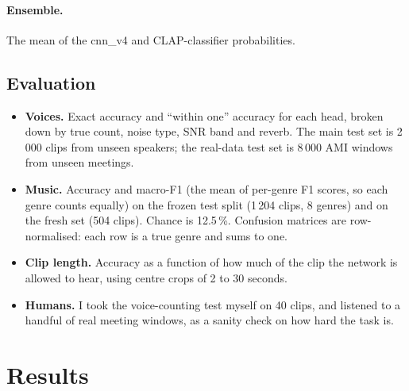 \documentclass[11pt]{article}
\begin{document}
\paragraph{Ensemble.} The mean of the cnn\_v4 and CLAP-classifier probabilities.

\subsection{Evaluation}
\begin{itemize}
  \item \textbf{Voices.} Exact accuracy and ``within one'' accuracy for each head, broken down by true count, noise type, SNR band and reverb. The main test set is 2\,000 clips from unseen speakers; the real-data test set is 8\,000 AMI windows from unseen meetings.
  \item \textbf{Music.} Accuracy and macro-F1 (the mean of per-genre F1 scores, so each genre counts equally) on the frozen test split (1\,204 clips, 8 genres) and on the fresh set (504 clips). Chance is 12.5\,\%. Confusion matrices are row-normalised: each row is a true genre and sums to one.
  \item \textbf{Clip length.} Accuracy as a function of how much of the clip the network is allowed to hear, using centre crops of 2 to 30 seconds.
  \item \textbf{Humans.} I took the voice-counting test myself on 40 clips, and listened to a handful of real meeting windows, as a sanity check on how hard the task is.
\end{itemize}

\section{Results}\label{sec:results}
\end{document}

